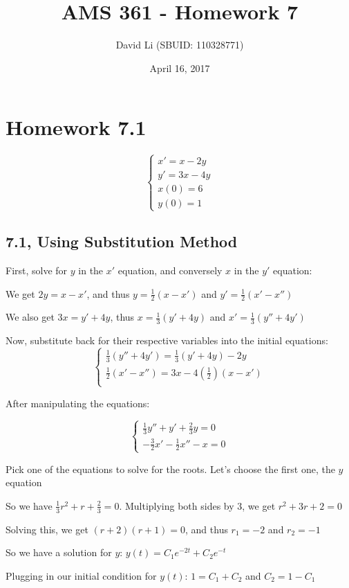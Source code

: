 \documentclass{article}
\title{AMS 361 - Homework 7}
\author{David Li (SBUID: 110328771)}
\date{April 16, 2017}
\begin{document}
\maketitle

\section{Homework 7.1}

\noindent $$
\begin{cases}
x' = x - 2y\\
y' = 3x - 4y\\
x(0) = 6 \\
y(0) = 1
\end{cases}
$$ \par\vspace{0.25cm}

\subsection{7.1, Using Substitution Method}
\noindent First, solve for $y$ in the $x'$ equation, and conversely $x$ in the $y'$ equation: \par
\noindent We get $2y = x - x'$, and thus $y = \frac{1}{2}(x - x')$ and $y' = \frac{1}{2}(x' - x'')$ \par
\noindent We also get $3x = y' + 4y$, thus $x = \frac{1}{3}(y' + 4y)$ and $x' = \frac{1}{3}(y'' + 4y')$ \par\vspace{0.25cm}

\noindent Now, substitute back for their respective variables into the initial equations: \noindent $$
\begin{cases}
\frac{1}{3}(y'' + 4y') = \frac{1}{3}(y' + 4y) - 2y\\
\frac{1}{2}(x' - x'') = 3x - 4(\frac{1}{2})(x - x')\\
\end{cases}
$$ \par
\noindent After manipulating the equations: \par
\noindent $$
\begin{cases}
\frac{1}{3}y'' + y' + \frac{2}{3}y = 0\\
-\frac{3}{2}x' - \frac{1}{2}x'' - x = 0
\end{cases}
$$ \par\vspace{0.25cm}

\noindent Pick one of the equations to solve for the roots.  Let's choose the first one, the $y$ equation \par
\noindent So we have $\frac{1}{3}r^{2} + r + \frac{2}{3} = 0$.  Multiplying both sides by 3, we get $r^{2} + 3r + 2 = 0$ \par
\noindent Solving this, we get $(r + 2)(r + 1) = 0$, and thus $r_{1} = -2$ and $r_{2} = -1$ \par
\noindent So we have a solution for $y$: $y(t) = C_{1}e^{-2t} + C_{2}e^{-t}$ \par
\noindent Plugging in our initial condition for $y(t)$: $1 = C_{1} + C_{2}$ and $C_{2} = 1 - C_{1}$
\par\vspace{0.25cm}
\end{document}
